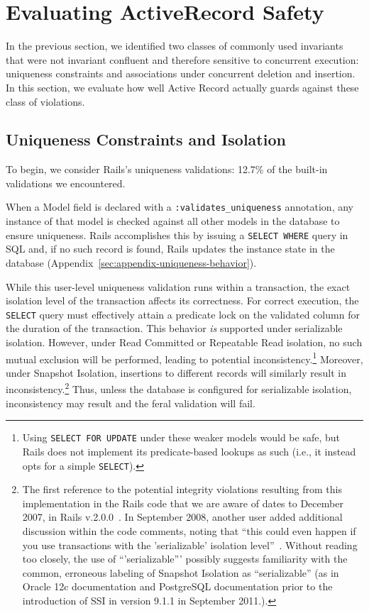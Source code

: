 
\section{Evaluating ActiveRecord Safety}
\label{sec:evaluation}

In the previous section, we identified two classes of commonly used
invariants that were not invariant confluent and therefore sensitive
to concurrent execution: uniqueness constraints and associations under
concurrent deletion and insertion. In this section, we evaluate
how well Active Record actually guards against these class of
violations. 

\subsection{Uniqueness Constraints and Isolation}

To begin, we consider Rails's uniqueness validations: 12.7\% of the
built-in validations we encountered.

When a Model field is declared with a \texttt{:validates\_uniqueness}
annotation, any instance of that model is checked against all other
models in the database to ensure uniqueness. Rails accomplishes this
by issuing a \texttt{SELECT WHERE} query in SQL and, if no such record
is found, Rails updates the instance state in the database
(Appendix~\ref{sec:appendix-uniqueness-behavior}).

While this user-level uniqueness validation runs within a transaction,
the exact isolation level of the transaction affects its
correctness. For correct execution, the \texttt{SELECT} query must
effectively attain a predicate lock on the validated column for the
duration of the transaction. This behavior \textit{is} supported under
serializable isolation. However, under Read Committed or Repeatable
Read isolation, no such mutual exclusion will be performed, leading to
potential inconsistency.\footnote{Using \texttt{SELECT FOR UPDATE}
  under these weaker models would be safe, but Rails does not
  implement its predicate-based lookups as such (i.e., it instead opts
  for a simple \texttt{SELECT}).}  Moreover, under Snapshot Isolation,
insertions to different records will similarly result in
inconsistency.\footnote{The first reference to the potential integrity
  violations resulting from this implementation in the Rails code that
  we are aware of dates to December 2007, in Rails
  v.2.0.0~\cite{code-unique-race-one}.  In September 2008, another
  user added additional discussion within the code comments, noting
  that ``this could even happen if you use transactions with the
  'serializable' isolation
  level''~\cite{code-unique-race-two}. Without reading too closely,
  the use of ``'serializable''' possibly suggests familiarity with the
  common, erroneous labeling of Snapshot Isolation as ``serializable''
  (as in Oracle 12c documentation and PostgreSQL documentation prior
  to the introduction of SSI in version 9.1.1 in September
  2011.)\label{fn:si-rails}. } Thus, unless the database is configured
for serializable isolation, inconsistency may result and the feral
validation will fail.

